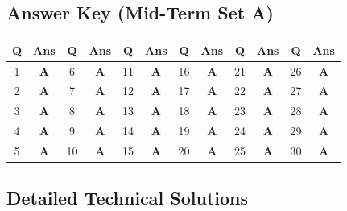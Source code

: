 \subsection*{Answer Key (Mid-Term Set A)}

\begin{center}
\begin{tabular}{|c|c||c|c||c|c||c|c||c|c||c|c|}
\hline
\textbf{Q} & \textbf{Ans} & \textbf{Q} & \textbf{Ans} & \textbf{Q} & \textbf{Ans} & \textbf{Q} & \textbf{Ans} & \textbf{Q} & \textbf{Ans} & \textbf{Q} & \textbf{Ans} \\
\hline
1 & \textbf{A} & 6 & \textbf{A} & 11 & \textbf{A} & 16 & \textbf{A} & 21 & \textbf{A} & 26 & \textbf{A} \\
2 & \textbf{A} & 7 & \textbf{A} & 12 & \textbf{A} & 17 & \textbf{A} & 22 & \textbf{A} & 27 & \textbf{A} \\
3 & \textbf{A} & 8 & \textbf{A} & 13 & \textbf{A} & 18 & \textbf{A} & 23 & \textbf{A} & 28 & \textbf{A} \\
4 & \textbf{A} & 9 & \textbf{A} & 14 & \textbf{A} & 19 & \textbf{A} & 24 & \textbf{A} & 29 & \textbf{A} \\
5 & \textbf{A} & 10 & \textbf{A} & 15 & \textbf{A} & 20 & \textbf{A} & 25 & \textbf{A} & 30 & \textbf{A} \\
\hline
\end{tabular}
\end{center}

\vspace{3mm}
\subsection*{Detailed Technical Solutions}

